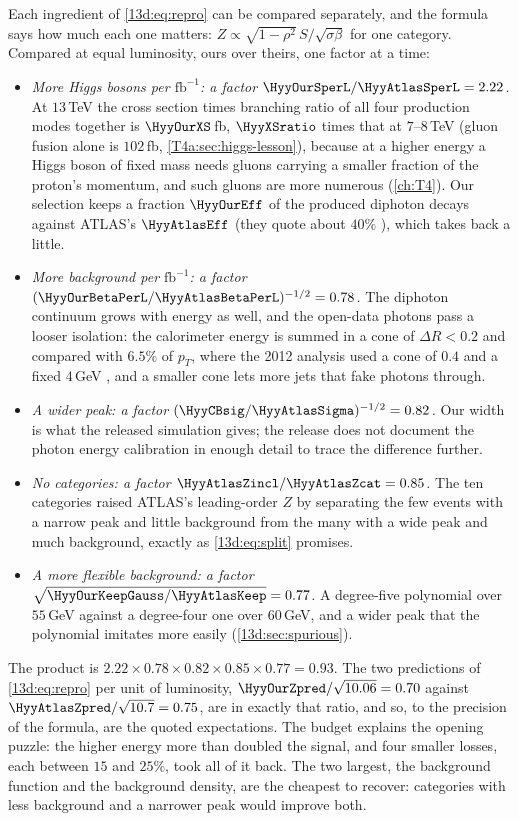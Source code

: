 Each ingredient of \eqref{13d:eq:repro} can be compared separately, and the formula says
how much each one matters: $Z\propto\sqrt{1-\rho^2}\,S/\sqrt{\sigma\beta}$ for one
category. Compared at equal luminosity, ours over theirs, one factor at a time:
\begin{itemize}[itemsep=2pt,leftmargin=1.2em]
  \item \emph{More Higgs bosons per $\mathrm{fb}^{-1}$: a factor
        $\HyyOurSperL/\HyyAtlasSperL=2.22$.} At $13\,$TeV the cross section times branching
        ratio of all four production modes together is $\HyyOurXS\,$fb, $\HyyXSratio$ times
        that at $7$--$8\,$TeV (gluon fusion alone is $102\,$fb, \cref{T4a:sec:higgs-lesson}),
        because at a higher energy a Higgs boson of fixed mass needs gluons carrying a
        smaller fraction of the proton's momentum, and such gluons are more numerous
        (\cref{ch:T4}). Our selection keeps a fraction $\HyyOurEff$ of the produced
        diphoton decays against ATLAS's $\HyyAtlasEff$ (they quote about $40\%$
        ), which takes back a little.
  \item \emph{More background per $\mathrm{fb}^{-1}$: a factor
        $(\HyyOurBetaPerL/\HyyAtlasBetaPerL)^{-1/2}=0.78$.} The diphoton continuum grows with
        energy as well, and the open-data photons pass a looser isolation: the calorimeter
        energy is summed in a cone of $\Delta R<0.2$ and compared with $6.5\%$ of $p_T$,
        where the 2012 analysis used a cone of $0.4$ and a fixed $4\,$GeV
        , and a smaller cone lets more jets that fake photons
        through.
  \item \emph{A wider peak: a factor $(\HyyCBsig/\HyyAtlasSigma)^{-1/2}=0.82$.} Our width
        is what the released simulation gives; the release does not document the photon
        energy calibration in enough detail to trace the difference further.
  \item \emph{No categories: a factor $\HyyAtlasZincl/\HyyAtlasZcat=0.85$.} The ten
        categories raised ATLAS's leading-order $Z$ by separating the few events with a
        narrow peak and little background from the many with a wide peak and much
        background, exactly as \eqref{13d:eq:split} promises.
  \item \emph{A more flexible background: a factor
        $\sqrt{\HyyOurKeepGauss/\HyyAtlasKeep}=0.77$.} A degree-five polynomial over
        $55\,$GeV against a degree-four one over $60\,$GeV, and a wider peak that the
        polynomial imitates more easily (\cref{13d:sec:spurious}).
\end{itemize}
The product is $2.22\times0.78\times0.82\times0.85\times0.77=0.93$. The two predictions of
\eqref{13d:eq:repro} per unit of luminosity, $\HyyOurZpred/\sqrt{10.06}=0.70$ against
$\HyyAtlasZpred/\sqrt{10.7}=0.75$, are in exactly that ratio, and so, to the precision of
the formula, are the quoted expectations. The budget explains the opening puzzle: the
higher energy more than doubled the signal, and four smaller losses, each between $15$ and
$25\%$, took all of it back. The two largest, the background function and the
background density, are the cheapest to recover: categories with less background and a
narrower peak would improve both.

